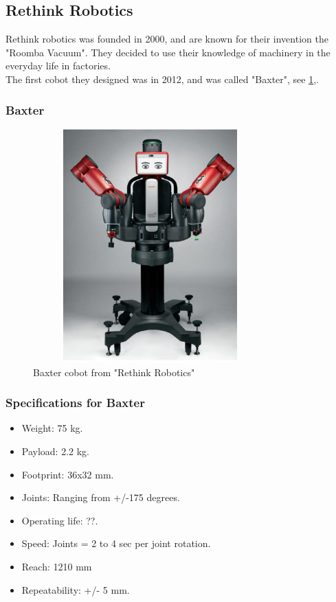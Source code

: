\subsection{Rethink Robotics}

Rethink robotics was founded in 2000, and are known for their invention the "Roomba Vacuum". They decided to use their knowledge of machinery in the everyday life in factories.\\
The first cobot they designed was in 2012, and was called "Baxter", see \ref{fig:Rethink},\cite{Rethink}.

\subsubsection{Baxter}
\begin{figure}[h!]
    \centering
    \includegraphics[width=9cm, height=9cm]{UR/baxter-robot-1.jpg}
    \caption{Baxter cobot from "Rethink Robotics"\cite{Rethinkbillede}} 
    \label{fig:Rethink}
\end{figure}

\subsubsection{Specifications for Baxter}
\begin{itemize}
    \item Weight: 75 kg.
    \item Payload: 2.2 kg.
    \item Footprint: 36x32 mm.
    \item Joints: Ranging from +/-175 degrees.
    \item Operating life: ??.
    \item Speed: Joints = 2 to 4 sec per joint rotation.
    \item Reach: 1210 mm
    \item Repeatability: +/- 5 mm.
\end{itemize}
\cite{Rethinkspec}

